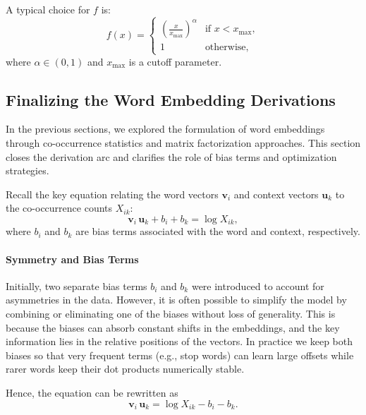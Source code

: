A typical choice for \( f \) is:
\begin{equation}
    f(x) = \begin{cases}
    \left(\frac{x}{x_{\max}}\right)^\alpha & \text{if } x < x_{\max}, \\
    1 & \text{otherwise},
    \end{cases}
    \label{eq:weighting_function}
\end{equation}
where \( \alpha \in (0,1) \) and \( x_{\max} \) is a cutoff parameter.

\subsection{Finalizing the Word Embedding Derivations}
\label{sec:nlp_finalizing_the_word_embedding_derivations}

In the previous sections, we explored the formulation of word embeddings through co-occurrence statistics and matrix factorization approaches. This section closes the derivation arc and clarifies the role of bias terms and optimization strategies.

Recall the key equation relating the word vectors \( \mathbf{v}_i \) and context vectors \( \mathbf{u}_k \) to the co-occurrence counts \( X_{ik} \):
\begin{equation}
    \mathbf{v}_i\,\mathbf{u}_k + b_i + b_k = \log X_{ik},
    \label{eq:cooccurrence_log}
\end{equation}
where \( b_i \) and \( b_k \) are bias terms associated with the word and context, respectively.

\paragraph{Symmetry and Bias Terms}

Initially, two separate bias terms \( b_i \) and \( b_k \) were introduced to account for asymmetries in the data. However, it is often possible to simplify the model by combining or eliminating one of the biases without loss of generality. This is because the biases can absorb constant shifts in the embeddings, and the key information lies in the relative positions of the vectors. In practice we keep both biases so that very frequent terms (e.g., stop words) can learn large offsets while rarer words keep their dot products numerically stable.

Hence, the equation can be rewritten as
\begin{equation}
    \mathbf{v}_i\,\mathbf{u}_k = \log X_{ik} - b_i - b_k.
    \label{eq:cooccurrence_log_bias}
\end{equation}

